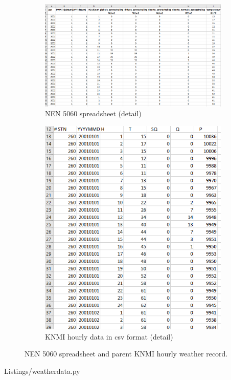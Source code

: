 \begin{figure}[H]
	\begin{subfigure}{.7\textwidth}
		\centering
		\includegraphics[width=.8\linewidth]{Figures/NEN5060.png}  
		\caption{NEN 5060 spreadsheet (detail)}
		\label{fig:nen5060}
	\end{subfigure}
	\begin{subfigure}{.3\textwidth}
		\centering
		\includegraphics[width=.8\linewidth]{Figures/KNMI.png}  
		\caption{KNMI hourly data in csv format (detail)}
		\label{fig:knmi}
	\end{subfigure}
	\caption{NEN 5060 spreadsheet and parent KNMI hourly weather record.}
	\label{fig:fig}
\end{figure}


 
{Listings/weatherdata.py}

